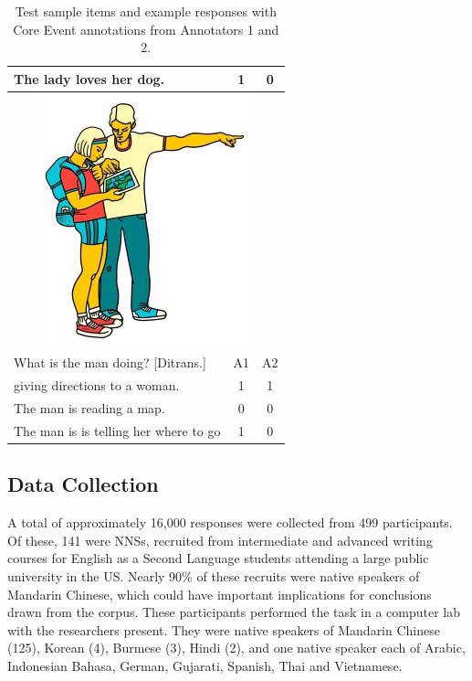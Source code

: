 \documentclass[11pt,a4paper]{article}
\begin{document}
\begin{table}[htb!]
\begin{center}
\begin{tabular}{|l|c|c|}
\hline
The lady loves her dog. & 1 & 0 \\
\hline
\hline
\multicolumn{3}{|c|}{\includegraphics[width=0.5\columnwidth]{figures/I28.jpg}} \\
\hline
What is the man doing? [Ditrans.] & A1 & A2 \\
\hline
giving directions to a woman. & 1 & 1 \\
\hline
The man is reading a map. & 0 & 0 \\
\hline
The man is is telling her where to go & 1 & 0 \\
\hline
\end{tabular}
\caption{\label{tab:test-sample-items} Test sample items and example responses with Core Event annotations from Annotators 1 and 2.}
\end{center}
\end{table}


\subsection{Data Collection}

A total of approximately 16,000 responses were collected from 499 participants. Of these, 141 were NNSs, recruited from intermediate and advanced writing courses for English as a Second Language students attending a large public university in the US. Nearly 90\% of these recruits were native speakers of Mandarin Chinese, which could have important implications for conclusions drawn from the corpus. These participants performed the task in a computer lab with the researchers present. They were native speakers of Mandarin Chinese (125), Korean (4), Burmese (3), Hindi (2), and one native speaker each of Arabic, Indonesian Bahasa, German, Gujarati, Spanish, Thai and Vietnamese.
\end{document}
